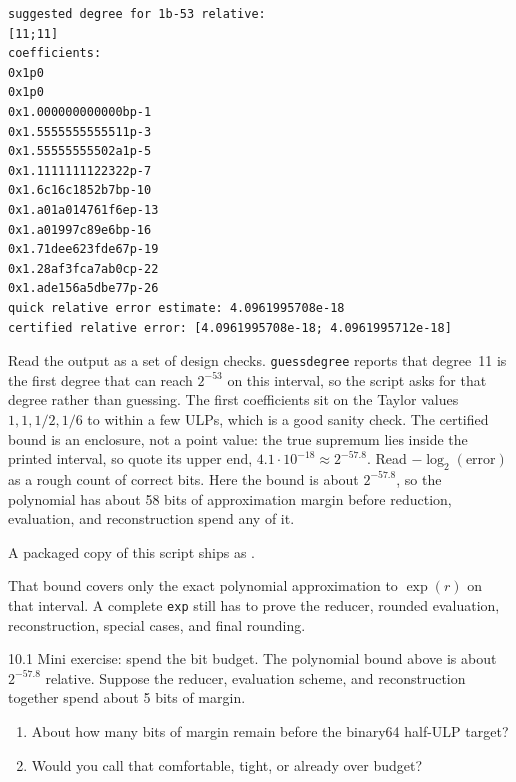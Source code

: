 \documentclass[manuscript, nonacm]{acmart}
\begin{document}
    \begin{lstlisting}[style=output]
suggested degree for 1b-53 relative:
[11;11]
coefficients:
0x1p0
0x1p0
0x1.000000000000bp-1
0x1.5555555555511p-3
0x1.55555555502a1p-5
0x1.1111111122322p-7
0x1.6c16c1852b7bp-10
0x1.a01a014761f6ep-13
0x1.a01997c89e6bp-16
0x1.71dee623fde67p-19
0x1.28af3fca7ab0cp-22
0x1.ade156a5dbe77p-26
quick relative error estimate: 4.0961995708e-18
certified relative error: [4.0961995708e-18; 4.0961995712e-18]
    \end{lstlisting}

    Read the output as a set of design checks.  \texttt{guessdegree} reports
    that degree~11 is the first degree that can reach $2^{-53}$ on this interval,
    so the script asks for that degree rather than guessing. The first coefficients
    sit on the Taylor values $1, 1, 1/2, 1/6$ to within a few ULPs, which is
    a good sanity check. The certified bound is an enclosure, not a point
    value: the true supremum lies inside the printed interval, so quote its
    upper end, $4.1 \cdot 10^{-18} \approx 2^{-57.8}$. Read
    $-\log_2(\text{error})$ as a rough count of correct bits. Here the bound is
    about $2^{-57.8}$, so the polynomial has about 58 bits of approximation
    margin before reduction, evaluation, and reconstruction spend any of it.

    A packaged copy of this script ships as
    .

    That bound covers only the exact polynomial approximation to $\exp(r)$ on
    that interval. A complete \texttt{exp} still has to prove the reducer,
    rounded evaluation, reconstruction, special cases, and final rounding.


    \begin{checkpoint}{10.1}
        Mini exercise: spend the bit budget. The polynomial bound above is about
        $2^{-57.8}$ relative. Suppose the reducer, evaluation scheme, and
        reconstruction together spend about 5 bits of margin.
        \begin{enumerate}
            \item About how many bits of margin remain before the binary64
            half-ULP target?
            \item Would you call that comfortable, tight, or already over budget?
        \end{enumerate}
    \end{checkpoint}

\end{document}
